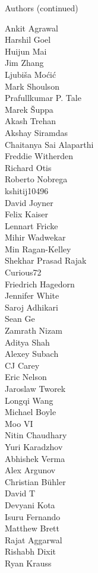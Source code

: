 \begin{frame}{Authors (continued)}
\begin{multicols}{5}
Ankit Agrawal\\
Harshil Goel\\
Huijun Mai\\
Jim Zhang\\
Ljubiša Moćić\\
Mark Shoulson\\
Prafullkumar P. Tale\\
Marek Šuppa\\
Akash Trehan\\
Akshay Siramdas\\
Chaitanya Sai Alaparthi\\
Freddie Witherden\\
Richard Otis\\
Roberto Nobrega\\
kshitij10496\\
David Joyner\\
Felix Kaiser\\
Lennart Fricke\\
Mihir Wadwekar\\
Min Ragan-Kelley\\
Shekhar Prasad Rajak\\
Curious72\\
Friedrich Hagedorn\\
Jennifer White\\
Saroj Adhikari\\
Sean Ge\\
Zamrath Nizam\\
Aditya Shah\\
Alexey Subach\\
CJ Carey\\
Eric Nelson\\
Jaroslaw Tworek\\
Longqi Wang\\
Michael Boyle\\
Moo VI\\
Nitin Chaudhary\\
Yuri Karadzhov\\
Abhishek Verma\\
Alex Argunov\\
Christian Bühler\\
David T\\
Devyani Kota\\
Isuru Fernando\\
Matthew Brett\\
Rajat Aggarwal\\
Rishabh Dixit\\
Ryan Krauss\\

\end{multicols}
\end{frame}
